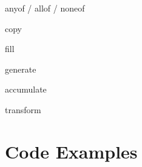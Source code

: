 \documentclass[notes]{beamer}
\begin{document}
\begin{frame}{any\textunderscore of / all\textunderscore of / none\textunderscore of}

\end{frame}

\begin{frame}{copy}

\end{frame}

\begin{frame}{fill}

\end{frame}

\begin{frame}{generate}

\end{frame}

\begin{frame}{accumulate}

\end{frame}

\begin{frame}{transform}

\end{frame}

\section{Code Examples}

\end{document}
